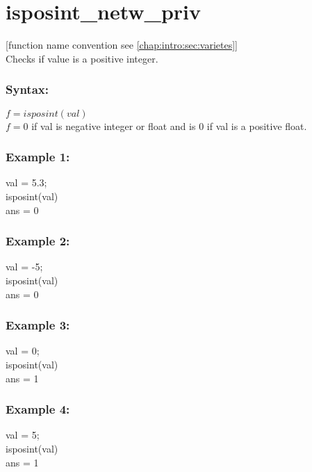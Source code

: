 \section{isposint\_netw\_priv}
\footnotesize[function name convention see \ref{chap:intro:sec:varietes}]\\
\normalsize
Checks if value is a positive integer.\\

\subsubsection{Syntax:}

$f = isposint(val)$\\
$f = 0$ if val is negative integer or float and is 0 if val is a positive float.\\

\subsubsection{Example 1:}
val = 5.3;\\
isposint(val)\\
ans = 0\\

\subsubsection{Example 2:}
val = -5;\\
isposint(val)\\
ans = 0\\

\subsubsection{Example 3:}
val = 0;\\
isposint(val)\\
ans = 1\\

\subsubsection{Example 4:}
val = 5;\\
isposint(val)\\
ans = 1\\


